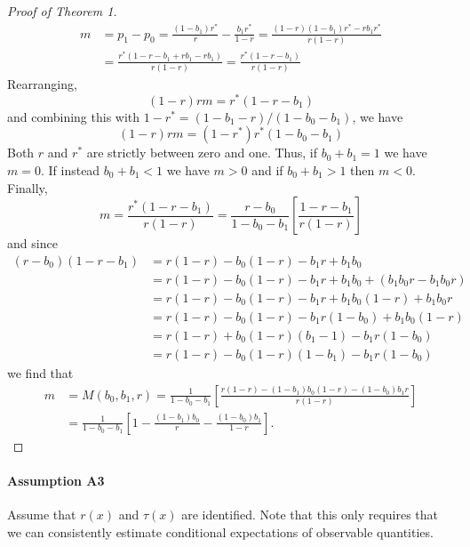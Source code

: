 \documentclass[12pt]{article}
\begin{document}
\begin{proof}[Proof of Theorem 1]
\begin{align*}
  m &= p_1 - p_0 = \frac{(1 - b_1)r^*}{r} - \frac{b_1r^*}{1- r} = \frac{(1 - r)(1 - b_1) r^* - r b_1 r^*}{r(1 - r)}\\
  &= \frac{r^*( 1 - r - b_1 + r b_1 - r b_1 )}{r (1 - r)} = \frac{r^*(1 - r - b_1)}{r(1-r)}
\end{align*}
Rearranging,
\[
  (1-r)rm = r^*(1 - r - b_1)
\]
and combining this with $1 - r^* = (1 - b_1 - r) / (1 - b_0 - b_1)$, we have
\[
  (1-r)rm = (1 - r^*)r^*(1 - b_0 - b_1)
\]
Both $r$ and $r^*$ are strictly between zero and one.
Thus, if $b_0 + b_1 = 1$ we have $m = 0$.
If instead $b_0 + b_1 <1$ we have $m>0$ and if $b_0 + b_1 > 1$ then $m <0$.
Finally,
\[
  m = \frac{r^*(1 - r - b_1)}{r(1-r)} = \frac{r - b_0}{1 - b_0 - b_1}\left[ \frac{1 - r - b_1}{r(1 - r)} \right] 
\]
and since 
\begin{align*}
 (r - b_0)(1 - r - b_1) &= r(1-r) - b_0(1-r) - b_1r + b_1 b_0  \\
  &= r(1-r) - b_0(1-r) - b_1r + b_1 b_0  + (b_1 b_0 r - b_1 b_0 r)\\
  &= r(1-r) - b_0(1-r) - b_1r + b_1 b_0(1 - r)  + b_1 b_0 r \\
  &= r(1-r) - b_0(1-r) - b_1r(1 - b_0) + b_1 b_0(1 - r) \\
  &= r(1-r) + b_0(1-r)(b_1 - 1) - b_1r(1 - b_0) \\
  &= r(1-r) - b_0(1-r)(1 - b_1) - b_1r(1 - b_0) 
\end{align*}
we find that
\begin{align*}
  m &= M(b_0, b_1, r) = \frac{1}{1 - b_0 - b_1}\left[ \frac{r(1-r) - (1 - b_1)b_0(1-r) - (1-b_0)b_1r}{r(1-r)} \right]\\
  &= \frac{1}{1 - b_0 - b_1}\left[ 1 - \frac{(1 - b_1)b_0}{r} - \frac{(1-b_0)b_1}{1-r} \right].
\end{align*}
\end{proof}


\paragraph{Assumption A3} Assume that $r(x)$ and $\tau(x)$ are identified.
Note that this only requires that we can consistently estimate conditional expectations of observable quantities.
\end{document}
